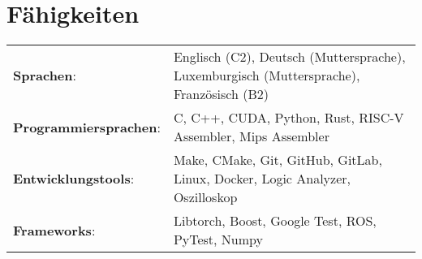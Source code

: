 \documentclass[a4paper,11pt]{article}
\begin{document}
\section{Fähigkeiten}
\footnotesize{
\begin{tabularx}{\linewidth}{@{}l X@{}}
    \textbf{Sprachen}: & { Englisch (C2), Deutsch (Muttersprache), Luxemburgisch (Muttersprache), Französisch (B2)} \\
    \textbf{Programmiersprachen}: & { C, C++, CUDA, Python, Rust, RISC-V Assembler, Mips Assembler} \\
    \textbf{Entwicklungstools}: & { Make, CMake, Git, GitHub, GitLab, Linux, Docker, Logic Analyzer, Oszilloskop} \\
    \textbf{Frameworks}: & { Libtorch, Boost, Google Test, ROS, PyTest, Numpy} \\
\end{tabularx}
}
\end{document}
